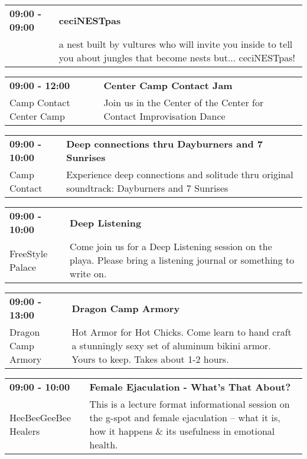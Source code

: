 \begin{tabular}{ p{1in} p{2.2in} }
    \textbf{09:00 - 09:00} & \textbf{ceciNESTpas} \\
    ~ \newline  & a nest built by vultures who will invite you inside to tell you about jungles that become nests but... ceciNESTpas! \\
    \hline 
\end{tabular}
    
\begin{tabular}{ p{1in} p{2.2in} }
    \textbf{09:00 - 12:00} & \textbf{Center Camp Contact Jam} \\
    Camp Contact \newline Center Camp & Join us in the Center of the Center for Contact Improvisation Dance \\
    \hline 
\end{tabular}
    
\begin{tabular}{ p{1in} p{2.2in} }
    \textbf{09:00 - 10:00} & \textbf{Deep connections thru Dayburners and 7 Sunrises} \\
    Camp Contact \newline  & Experience deep connections and solitude thru original soundtrack: Dayburners and 7 Sunrises \\
    \hline 
\end{tabular}
    
\begin{tabular}{ p{1in} p{2.2in} }
    \textbf{09:00 - 10:00} & \textbf{Deep Listening} \\
    FreeStyle Palace \newline  & Come join us for a Deep Listening session on the playa.  Please bring a listening journal or something to write on. \\
    \hline 
\end{tabular}
    
\begin{tabular}{ p{1in} p{2.2in} }
    \textbf{09:00 - 13:00} & \textbf{Dragon Camp Armory} \\
    Dragon Camp Armory \newline  & Hot Armor for Hot Chicks. Come learn to hand craft a stunningly sexy set of aluminum bikini armor. Yours to keep. Takes about 1-2 hours. \\
    \hline 
\end{tabular}
    
\begin{tabular}{ p{1in} p{2.2in} }
    \textbf{09:00 - 10:00} & \textbf{Female Ejaculation - What's That About?} \\
    HeeBeeGeeBee Healers \newline  & This is a lecture format informational session on the g-spot and female ejaculation -- what it is, how it happens \& its usefulness in emotional health. \\
    \hline 
\end{tabular}
    
